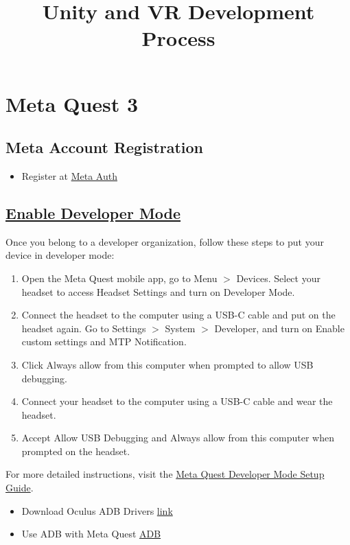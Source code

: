 \documentclass{article}
\begin{document}
\title{Unity and VR Development Process}
\author{}
\date{}
\maketitle

\section{Meta Quest 3}
\subsection{Meta Account Registration}

\begin{itemize}
    \item Register at \href{https://auth.meta.com/}{Meta Auth}
\end{itemize}

\subsection{\href{https://developer.oculus.com/documentation/unity/book-unity-gsg/}{Enable Developer Mode}}

Once you belong to a developer organization, follow these steps to put your device in developer mode:

\begin{enumerate}
    \item Open the Meta Quest mobile app, go to Menu $>$ Devices. Select your headset to access Headset Settings and turn on Developer Mode.
    \item Connect the headset to the computer using a USB-C cable and put on the headset again. Go to Settings $>$ System $>$ Developer, and turn on Enable custom settings and MTP Notification.
    \item Click Always allow from this computer when prompted to allow USB debugging.
    \item Connect your headset to the computer using a USB-C cable and wear the headset.
    \item Accept Allow USB Debugging and Always allow from this computer when prompted on the headset.
\end{enumerate}

For more detailed instructions, visit the \href{https://developer.oculus.com/documentation/native/android/mobile-device-setup/#enable-developer-mode}{Meta Quest Developer Mode Setup Guide}.

\begin{itemize}
    \item Download Oculus ADB Drivers \href{https://developer.oculus.com/downloads/package/oculus-adb-drivers/}{link}
    \item Use ADB with Meta Quest \href{https://developer.oculus.com/documentation/native/android/ts-adb/#mobile-android-debug-intro}{ADB}
\end{itemize}
\end{document}

